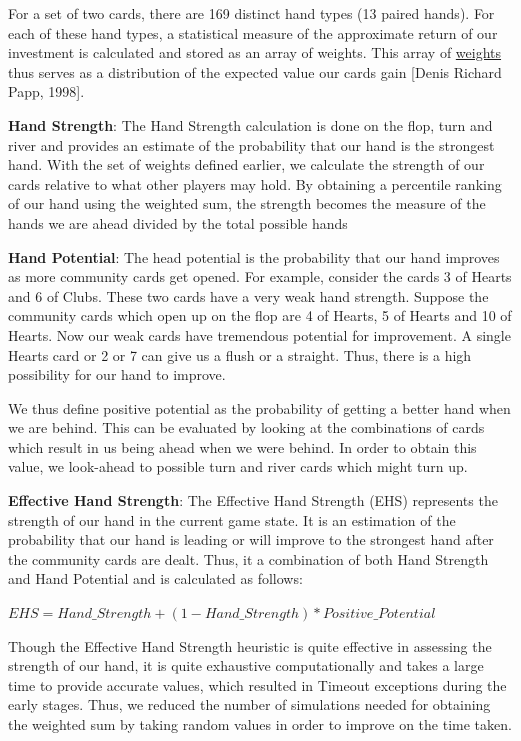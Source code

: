 \documentclass{article}
\begin{document}
For a set of two cards, there are 169 distinct hand types (13 paired hands). For each of these hand types, a statistical measure of the approximate return of our investment is calculated and stored as an array of weights. This array of \href{http://poker.cs.ualberta.ca/publications/papp.msc.pdf}{weights} thus serves as a distribution of the expected value our cards gain [Denis Richard Papp, 1998]. 

{\bf Hand Strength}: The Hand Strength calculation is done on the flop, turn and river and provides an estimate of the probability that our hand is the strongest hand. With the set of weights defined earlier, we calculate the strength of our cards relative to what other players may hold. By obtaining a percentile ranking of our hand using the weighted sum, the strength becomes the measure of the hands we are ahead divided by the total possible hands

{\bf Hand Potential}: The head potential is the probability that our hand improves as more community cards get opened. For example, consider the cards 3 of Hearts and 6 of Clubs. These two cards have a very weak hand strength. Suppose the community cards which open up on the flop are 4 of Hearts, 5 of Hearts and 10 of Hearts. Now our weak cards have tremendous potential for improvement. A single Hearts card or 2 or 7 can give us a flush or a straight. Thus, there is a high possibility for our hand to improve. 

We thus define positive potential as the probability of getting a better hand when we are behind. This can be evaluated by looking at the combinations of cards which result in us being ahead when we were behind. In order to obtain this value, we look-ahead to possible turn and river cards which might turn up.

{\bf Effective Hand Strength}: The Effective Hand Strength (EHS) represents the strength of our hand in the current game state. It is an estimation of the probability that our hand is leading or will improve to the strongest hand after the community cards are dealt. Thus, it a combination of both Hand Strength and Hand Potential and is calculated as follows:

$EHS = Hand\_Strength + (1 - Hand\_Strength) * Positive\_Potential$

Though the Effective Hand Strength heuristic is quite effective in assessing the strength of our hand, it is quite exhaustive computationally and takes a large time to provide accurate values, which resulted in Timeout exceptions during the early stages. Thus, we reduced the number of simulations needed for obtaining the weighted sum by taking random values in order to improve on the time taken. 
\end{document}

